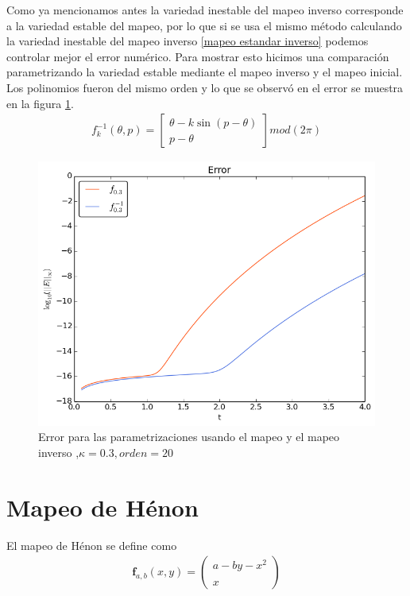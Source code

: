 Como ya mencionamos antes la variedad inestable del mapeo inverso corresponde a la variedad estable del mapeo, por lo que si se usa el mismo método calculando la variedad inestable del mapeo inverso \ref{mapeo estandar inverso} podemos controlar mejor el error numérico. Para mostrar esto hicimos una comparación parametrizando la variedad estable mediante el mapeo inverso y el mapeo inicial. Los polinomios fueron del mismo orden y lo que se observó en el error se muestra en la figura \ref{erroresinverso}.
\begin{eqnarray}
f_{k}^{-1}(\theta,p) = \left[\begin{array}{c}
\theta  -k\sin(p-\theta) \\
p -\theta
\end{array}\right] mod(2\pi) \label{mapeo estandar inverso}
\end{eqnarray}

\begin{figure}[H]
\centering
\includegraphics[scale=0.6]{mapeoinver}
\caption{Error para las parametrizaciones usando el mapeo y el mapeo inverso ,$\kappa=0.3, orden=20$ }
\label{erroresinverso}
\end{figure}




\section{Mapeo de Hénon}
El mapeo de Hénon se define como \cite{devaney}
\begin{eqnarray}
\mathbf{f}_{a,b}(x,y)=\left( \begin{array}{lcc}
             a-by-x^{2}\\
             \\ x
             \end{array}
             \right) \label{Henon}
\end{eqnarray}

